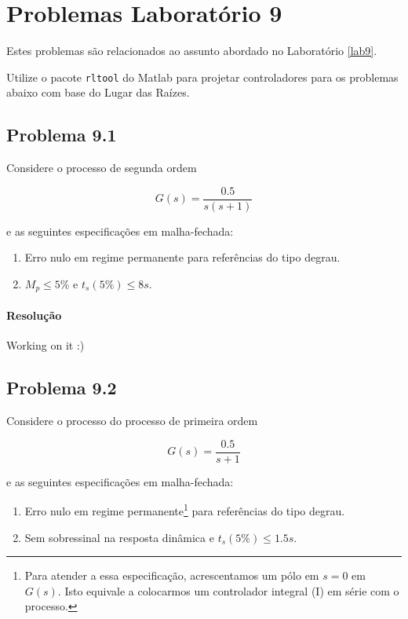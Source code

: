 \documentclass[
]{book}
\providecommand{\tightlist}{%
  \setlength{\itemsep}{0pt}\setlength{\parskip}{0pt}}
\theoremstyle{definition}
\theoremstyle{definition}
\theoremstyle{definition}
\theoremstyle{remark}
\begin{document}
\hypertarget{problemas-laboratuxf3rio-9}{%
\chapter*{Problemas Laboratório 9}\label{problemas-laboratuxf3rio-9}}

Estes problemas são relacionados ao assunto abordado no Laboratório \ref{lab9}.

Utilize o pacote \texttt{rltool} do Matlab para projetar controladores para os problemas abaixo com base do Lugar das Raízes.

\hypertarget{problema-9.1}{%
\section*{Problema 9.1}\label{problema-9.1}}

Considere o processo de segunda ordem

\[
G(s) = \frac{0.5}{s(s+1)}
\]

e as seguintes especificações em malha-fechada:

\begin{enumerate}
\def\labelenumi{\alph{enumi}.}
\tightlist
\item
  Erro nulo em regime permanente para referências do tipo degrau.
\item
  \(M_p \leq 5\%\) e \(t_s(5\%)\leq8s\).
\end{enumerate}

\hypertarget{resoluuxe7uxe3o-28}{%
\subsubsection*{Resolução}\label{resoluuxe7uxe3o-28}}

Working on it :)

\hypertarget{problema-9.2}{%
\section*{Problema 9.2}\label{problema-9.2}}

Considere o processo do processo de primeira ordem

\[
G(s) = \frac{0.5}{s+1}
\]

e as seguintes especificações em malha-fechada:

\begin{enumerate}
\def\labelenumi{\alph{enumi}.}
\tightlist
\item
  Erro nulo em regime permanente\footnote{Para atender a essa especificação, acrescentamos um pólo em \(s = 0\) em \(G(s)\). Isto equivale a colocarmos um controlador integral (I) em série com o processo.} para referências do tipo degrau.
\item
  Sem sobressinal na resposta dinâmica e \(t_s(5\%) \leq1.5s\).
\end{enumerate}
\end{document}
